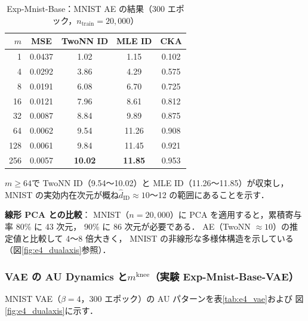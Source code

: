 \documentclass[11pt,a4paper]{jsarticle}
\newcommand{\mknee}{m^{\mathrm{knee}}}
\begin{document}
\begin{table}[H]
\centering
\caption{Exp-Mnist-Base：MNIST AE の結果（300 エポック，$n_{\mathrm{train}}=20{,}000$）}
\label{tab:e4_ae}
\small
\begin{tabular}{rcccc}
\toprule
$m$ & MSE & TwoNN ID & MLE ID & CKA \\
\midrule
1   & 0.0437 & 1.02  & 1.15  & 0.102 \\
4   & 0.0292 & 3.86  & 4.29  & 0.575 \\
8   & 0.0191 & 6.08  & 6.70  & 0.725 \\
16  & 0.0121 & 7.96  & 8.61  & 0.812 \\
32  & 0.0087 & 8.84  & 9.89  & 0.875 \\
64  & 0.0062 & 9.54  & 11.26 & 0.908 \\
128 & 0.0061 & 9.84  & 11.45 & 0.921 \\
256 & 0.0057 & \textbf{10.02} & \textbf{11.85} & 0.953 \\
\bottomrule
\end{tabular}
\end{table}

$m \geq 64$で TwoNN ID（9.54〜10.02）と MLE ID（11.26〜11.85）が収束し，
MNIST の実効内在次元が概ね$\hat{d}_\mathrm{ID} \approx 10$〜12 の範囲にあることを示す．

\textbf{線形 PCA との比較}：
MNIST（$n = 20{,}000$）に PCA を適用すると，累積寄与率 80\% に 43 次元，
90\% に 86 次元が必要である．
AE（TwoNN $\approx 10$）の推定値と比較して 4〜8 倍大きく，
MNIST の非線形な多様体構造を示している（図\ref{fig:e4_dualaxis}参照）．

\subsubsection{VAE の AU Dynamics と$\mknee$（実験 Exp-Mnist-Base-VAE）}

MNIST VAE（$\beta = 4$，300 エポック）の AU パターンを表\ref{tab:e4_vae}および
図\ref{fig:e4_dualaxis}に示す．
\end{document}
